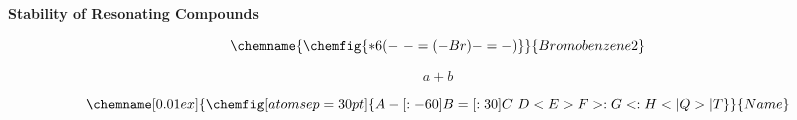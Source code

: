 \documentclass{article}
\begin{document}
\begin{center}
\textbf{Stability of Resonating Compounds}
\end{center}


\[
\chemname{\chemfig{*6(-~-=(-Br)-=-)}}{Bromobenzene 2}
\]


\[
a+b
\]

\[
\chemname[0.01ex]{
\chemfig[atom sep=30pt]{
A-[:-60]
B=[:30]
C~D<E>F
>:G<:H
<|Q>|T
}
}{Name}
\]
\end{document}
